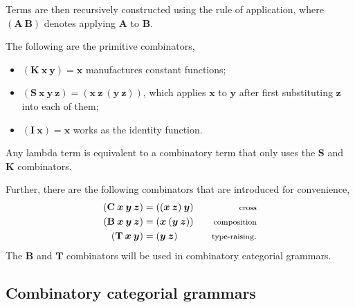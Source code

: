 Terms are then recursively constructed using the rule of application, where
$(\mathbf{A} \: \mathbf{B})$ denotes applying $\mathbf{A}$ to $\mathbf{B}$.

The following are the primitive combinators,
\begin{itemize}
  \item $(\mathbf{K} \: \bm{x} \: \bm{y}) = \bm{x}$ manufactures constant functions;
  \item $(\mathbf{S} \: \bm{x} \: \bm{y} \: \bm{z}) = (\bm{x} \: \bm{z} \:
    (\bm{y} \: \bm{z}))$, which applies $\bm{x}$ to $\bm{y}$ after first substituting
    $\bm{z}$ into each of them;
  \item $(\mathbf{I} \: \bm{x}) = \bm{x}$ works as the identity
    function.
\end{itemize}
Any lambda term is equivalent to a combinatory term that only uses the
$\mathbf{S}$ and $\mathbf{K}$ combinators.

Further, there are the following combinators that are introduced for
convenience,
\begin{align*}
  (\mathbf{C} \: \bm{x} \: \bm{y} \: \bm{z}) &= ((\bm{x} \: \bm{z}) \: \bm{y}) & \text{\footnotesize cross} \\
  (\mathbf{B} \: \bm{x} \: \bm{y} \: \bm{z}) &= (\bm{x} \: (\bm{y} \: \bm{z})) & \text{\footnotesize composition} \\
  (\mathbf{T} \: \bm{x} \: \bm{y}) &= (\bm{y} \: \bm{z}) & \text{\footnotesize type-raising}
.\end{align*}
The $\mathbf{B}$ and $\mathbf{T}$ combinators will be used in combinatory
categorial grammars.

\subsection{Combinatory categorial grammars}

